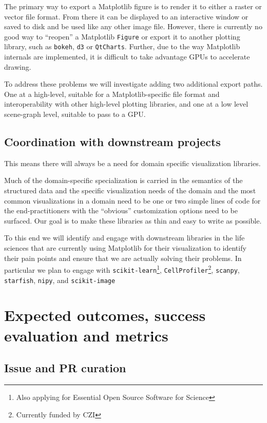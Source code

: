 \documentclass[11pt]{article}  %
\begin{document}
The primary way to export a Matplotlib figure is to render it to
either a raster or vector file format.  From there it can be displayed
to an interactive window or saved to disk and be used like any other
image file.  However, there is currently no good way to ``reopen'' a
Matplotlib \texttt{Figure} or export it to another plotting library,
such as \texttt{bokeh}, \texttt{d3} or \texttt{QtCharts}.
Further, due to the way Matplotlib internals are implemented, it
is difficult to take advantage GPUs to accelerate drawing.

To address these problems we will investigate adding two additional
export paths.  One at a high-level, suitable for a Matplotlib-specific
file format and interoperability with other high-level plotting
libraries, and one at a low level scene-graph level, suitable to pass
to a GPU.


\subsection{Coordination with downstream projects}

This means there will
always be a need for domain specific visualization libraries.

Much of the domain-specific specialization is carried in the semantics
of the structured data and the specific visualization needs of the
domain and the most common visualizations in a domain need to be one or
two simple lines of code for the end-practitioners with the ``obvious''
customization options need to be surfaced.  Our goal is to make these
libraries as thin and easy to write as possible.


To this end we will identify and engage with downstream libraries in
the life sciences that are currently using Matplotlib for their
visualization to identify their pain points and ensure that we are
actually solving their problems.  In particular we plan to engage with
\texttt{scikit-learn}\footnote{Also applying for Essential Open Source
Software for Science}, \texttt{CellProfiler}\footnote{Currently funded
by CZI\label{f:czi}}, \texttt{scanpy},
\texttt{starfish}, \texttt{nipy}, and
\texttt{scikit-image}


\section{Expected outcomes, success evaluation and metrics}
\subsection{Issue and PR curation}
\end{document}
